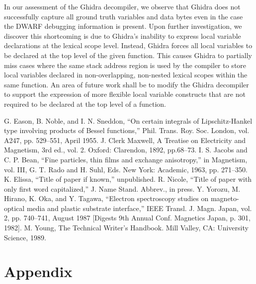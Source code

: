 \documentclass[conference]{IEEEtran}
\begin{document}
In our assessment of the Ghidra decompiler, we observe that Ghidra does not successfully capture all ground truth variables and data bytes even in the case the DWARF debugging information is present. Upon further investigation, we discover this shortcoming is due to Ghidra's inability to express local variable declarations at the lexical scope level. Instead, Ghidra forces all local variables to be declared at the top level of the given function. This causes Ghidra to partially miss cases where the same stack address region is used by the compiler to store local variables declared in non-overlapping, non-nested lexical scopes within the same function. An area of future work shall be to modify the Ghidra decompiler to support the expression of more flexible local variable constructs that are not required to be declared at the top level of a function.

\begin{thebibliography}{00}
 G. Eason, B. Noble, and I. N. Sneddon, ``On certain integrals of Lipschitz-Hankel type involving products of Bessel functions,'' Phil. Trans. Roy. Soc. London, vol. A247, pp. 529--551, April 1955.
 J. Clerk Maxwell, A Treatise on Electricity and Magnetism, 3rd ed., vol. 2. Oxford: Clarendon, 1892, pp.68--73.
 I. S. Jacobs and C. P. Bean, ``Fine particles, thin films and exchange anisotropy,'' in Magnetism, vol. III, G. T. Rado and H. Suhl, Eds. New York: Academic, 1963, pp. 271--350.
 K. Elissa, ``Title of paper if known,'' unpublished.
 R. Nicole, ``Title of paper with only first word capitalized,'' J. Name Stand. Abbrev., in press.
 Y. Yorozu, M. Hirano, K. Oka, and Y. Tagawa, ``Electron spectroscopy studies on magneto-optical media and plastic substrate interface,'' IEEE Transl. J. Magn. Japan, vol. 2, pp. 740--741, August 1987 [Digests 9th Annual Conf. Magnetics Japan, p. 301, 1982].
 M. Young, The Technical Writer's Handbook. Mill Valley, CA: University Science, 1989.
\end{thebibliography}

\onecolumn

\section*{Appendix} \label{sec:appendix}
\small




\end{document}

